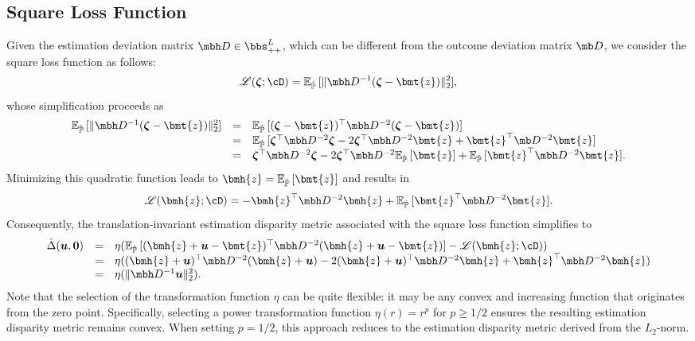 \documentclass[opre, blindrev]{informs4}
\newcommand{\1}[1]{\mathds{1}{\left(#1\right)}}
\begin{document}
\subsection*{Square Loss Function}
Given the estimation deviation matrix $\mbh D \in \bbs^L_{++}$, which can be different from the outcome deviation matrix $\mb D$, we consider the square loss function as follows:
$$
\mathscr{L}(\bm{\zeta}; \cD) = \mathbb{E}_{\hat{\mathbb{P}}}\,[\|\mbh D^{-1}(\bm{\zeta} - \bmt{z})\|^2_2],
$$
whose simplification proceeds as
$$
\begin{array}{rcl}
\mathbb{E}_{\hat{\mathbb{P}}}\,[\|\mbh D^{-1}(\bm{\zeta} - \bmt{z})\|^2_2] &=& \mathbb{E}_{\hat{\mathbb{P}}}\,[(\bm{\zeta} - \bmt{z})^\top \mbh D^{-2}(\bm{\zeta} - \bmt{z})] \\
&=& \mathbb{E}_{\hat{\mathbb{P}}}\,[\bm{\zeta}^\top \mbh D^{-2} \bm{\zeta} - 2 \bm{\zeta}^\top \mbh D^{-2} \bmt{z} + \bmt{z}^\top \mb D^{-2} \bmt{z}] \\
&=& \bm{\zeta}^\top \mbh D^{-2} \bm{\zeta} - 2\bm{\zeta}^\top \mbh D^{-2} \mathbb{E}_{\hat{\mathbb{P}}}\,[\bmt{z}] + \mathbb{E}_{\hat{\mathbb{P}}}\,[\bmt{z}^\top  \mbh D^{-2} \bmt{z}].
\end{array}
$$
Minimizing this quadratic function leads to $\bmh{z} = \mathbb{E}_{\hat{\mathbb{P}}}\,[\bmt{z}]$ and results in
$$
\mathscr{L}(\bmh{z}; \cD) = -\bmh{z}^\top \mbh D^{-2} \bmh{z} + \mathbb{E}_{\hat{\mathbb{P}}}\,[\bmt{z}^\top  \mbh D^{-2}\bmt{z}].
$$
Consequently, the translation-invariant estimation disparity metric associated with the square loss function simplifies to
$$
\begin{array}{rcl}
\hat \Delta(\bm u,\bm 0) &=& \eta (\mathbb{E}_{\hat{\mathbb{P}}}\,[(\bmh{z} + \bm u - \bmt{z})^\top \mbh D^{-2}(\bmh{z} + \bm u- \bmt{z})] - \mathscr{L}(\bmh{z}; \cD)) \\
&=& \eta ((\bmh{z} + \bm{u})^\top \mbh D^{-2} (\bmh{z} + \bm u) - 2(\bmh{z} + \bm{u})^\top \mbh D^{-2} \bmh{z} + \bmh{z}^\top \mbh D^{-2} \bmh{z}) \\
&=& \eta(\|\mbh D^{-1} \bm u\|^2_2). 
\end{array}
$$
Note that the selection of the transformation function $\eta$ can be quite flexible: it may be any convex and increasing function that originates from the zero point. Specifically, selecting a power transformation function $\eta(r) = r^p$ for $p \geq 1/2$ ensures the resulting estimation disparity metric remains convex. When setting $p = 1/2$, this approach reduces to the estimation disparity metric derived from the $L_2$-norm. 
\end{document}
